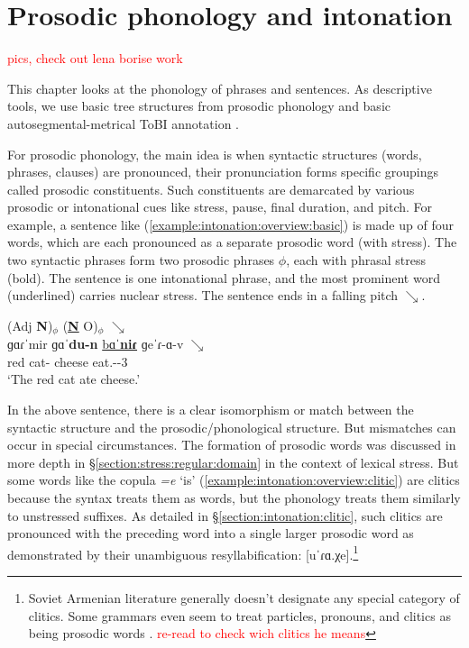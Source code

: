 \chapter{Prosodic phonology and intonation}\label{chapter:intonation}
\textcolor{red}{pics, check out lena borise work}

This chapter looks at the phonology of phrases and sentences.  As   descriptive tools, we use basic tree structures from prosodic phonology \citep{Selkirk-1986-DerivedDomains,Nespor-Vogel-1986-ProsodicPhon} and basic autosegmental-metrical ToBI annotation \citep{Pierrehumbert-1980-phonologyPhoneticsEnglishIntonation,ladd-2008-intonationalPhonology,jun-2007-prosodicTypologyPhonologyIntonationPhrasing}. 

For prosodic phonology, the main idea is when syntactic structures (words, phrases, clauses) are pronounced, their pronunciation  forms specific groupings called prosodic constituents. Such constituents are demarcated by various prosodic or intonational cues like stress, pause, final duration, and pitch. For example, a sentence like (\ref{example:intonation:overview:basic}) is made up of four words, which are each pronounced as a separate prosodic word (with stress). The two syntactic phrases form two prosodic phrases $\phi$, each with phrasal stress (bold). The sentence is one intonational phrase, and the most prominent word (underlined) carries nuclear stress. The sentence ends in a falling pitch $\searrow$. 

\begin{exe}
	\ex \begin{xlist}
		\ex \glll (Adj \textbf{N})$_\phi$ (\underline{\textbf{N}} O)$_\phi$ $\searrow$\\
		ɡɑɾˈmir ɡɑˈ\textbf{du-n} \underline{bɑˈ\textbf{niɾ}} ɡeˈɾ-ɑ-v $\searrow$ \\
		red cat-{} cheese eat.{\aorperf}-{\pst}-3{\sg} \\
		\trans `The red cat ate cheese.'  \label{example:intonation:overview:basic}
		\\ 
	\end{xlist}
\end{exe}


In the above sentence, there is a clear isomorphism or match between the syntactic structure and the prosodic/phonological structure. But mismatches can occur in special circumstances. The formation of prosodic words was discussed in more depth in \S\ref{section:stress:regular:domain} in the context of lexical stress. But some words like the copula \textit{=e} `is' (\ref{example:intonation:overview:clitic}) are clitics because the syntax treats them as words, but the phonology treats them similarly to unstressed suffixes. As detailed in \S\ref{section:intonation:clitic}, such clitics are pronounced with the preceding word into a single larger prosodic word as demonstrated by their unambiguous resyllabification: [uˈɾɑ.χe].\footnote{Soviet Armenian literature generally doesn't designate any special category of clitics. Some grammars even seem to treat particles, pronouns, and clitics as being prosodic words \citep[25]{Soukyasyan-2004-ArmenianPhonology}. \textcolor{red}{re-read to check wich clitics he means}}


